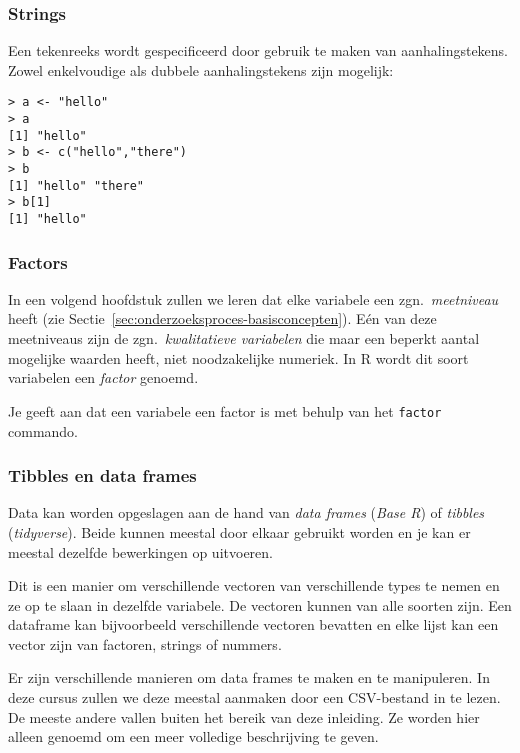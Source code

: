 \subsubsection{Strings}

Een tekenreeks wordt gespecificeerd door gebruik te maken van aanhalingstekens. Zowel enkelvoudige als dubbele aanhalingstekens zijn mogelijk:

\begin{lstlisting}
> a <- "hello"
> a
[1] "hello"
> b <- c("hello","there")
> b
[1] "hello" "there"
> b[1]
[1] "hello"
\end{lstlisting}

\subsubsection{Factors}

In een volgend hoofdstuk zullen we leren dat elke variabele een zgn.~\textit{meetniveau} heeft (zie Sectie~\ref{sec:onderzoeksproces-basisconcepten}). Eén van deze meetniveaus zijn de zgn.~\textit{kwalitatieve variabelen} die maar een beperkt aantal mogelijke waarden heeft, niet noodzakelijke numeriek. In R wordt dit soort variabelen een \textit{factor} genoemd.

Je geeft aan dat een variabele een factor is met behulp van het \texttt{factor} commando.

\subsubsection{Tibbles en data frames}

Data kan worden opgeslagen aan de hand van \textit{data frames} (\textit{Base R}) of \textit{tibbles} (\textit{tidyverse}). Beide kunnen meestal door elkaar gebruikt worden en je kan er meestal dezelfde bewerkingen op uitvoeren.

Dit is een manier om verschillende vectoren van verschillende types te nemen en ze op te slaan in dezelfde variabele. De vectoren kunnen van alle soorten zijn. Een dataframe kan bijvoorbeeld verschillende vectoren bevatten en elke lijst kan een vector zijn van factoren, strings of nummers.

Er zijn verschillende manieren om data frames te maken en te manipuleren. In deze cursus zullen we deze meestal aanmaken door een CSV-bestand in te lezen. De meeste andere vallen buiten het bereik van deze inleiding. Ze worden hier alleen genoemd om een meer volledige beschrijving te geven.

